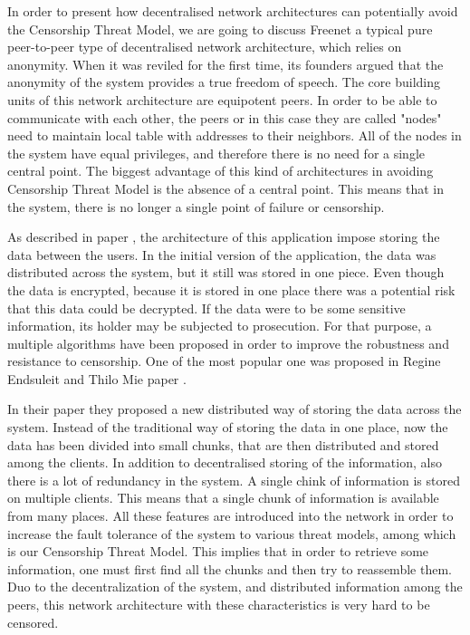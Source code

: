 In order to present how decentralised network architectures can potentially avoid the Censorship Threat Model, we are going to discuss Freenet \cite{clarke2001} a typical pure peer-to-peer \cite{web:peertopeer} type of decentralised network architecture, which relies on anonymity. When it was reviled for the first time, its founders argued that the anonymity of the system provides a true freedom of speech. The core building units of this network architecture are equipotent peers. In order to be able to communicate with each other, the peers or in this case they are called "nodes" need to maintain local table with addresses to their neighbors. All of the nodes in the system have equal privileges, and therefore there is no need for a single central point. The biggest advantage of this kind of architectures in avoiding Censorship Threat Model is the absence of a central point. This means that in the system, there is no longer a single point of failure or censorship.  

As described in paper \cite{clarke2001}, the architecture of this application impose storing the data between the users. In the initial version of the application, the data was distributed across the system, but it still was stored in one piece. Even though the data is encrypted, because it is stored in one place there was a potential risk that this data could be decrypted. If the data were to be some sensitive information, its holder may be subjected to prosecution. For that purpose, a multiple algorithms have been proposed in order to improve the robustness and resistance to censorship. One of the most popular one was proposed in Regine Endsuleit and Thilo Mie paper \cite{endsuleit2006}. 

In their paper they proposed a new distributed way of storing the data across the system. Instead of the traditional way of storing the data in one place, now the data has been divided into small chunks, that are then distributed and stored among the clients. In addition to decentralised storing of the information, also there is a lot of redundancy in the system. A single chink of information is stored on multiple clients. This means that a single chunk of information is available from many places. All these features are introduced into the network in order to increase the fault tolerance of the system to various threat models, among which is our Censorship Threat Model. This implies that in order to retrieve some information, one must first find all the chunks and then try to reassemble them. Duo to the decentralization of the system, and distributed information among the peers, this network architecture with these characteristics is very hard to be censored.
